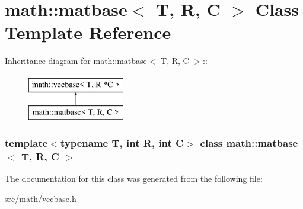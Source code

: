 \hypertarget{classmath_1_1matbase}{
\section{math::matbase$<$ T, R, C $>$ Class Template Reference}
\label{classmath_1_1matbase}
}
Inheritance diagram for math::matbase$<$ T, R, C $>$::\begin{figure}[H]
\begin{center}
\leavevmode
\includegraphics[height=2cm]{classmath_1_1matbase}
\end{center}
\end{figure}
\subsubsection*{template$<$typename T, int R, int C$>$ class math::matbase$<$ T, R, C $>$}



The documentation for this class was generated from the following file:\begin{DoxyCompactItemize}
\item 
src/math/vecbase.h\end{DoxyCompactItemize}
